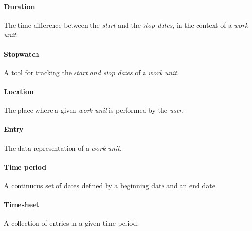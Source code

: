 \paragraph{Duration} The time difference between the \emph{start} and the
  \emph{stop dates}, in the context of a \emph{work unit}.
\paragraph{Stopwatch} A tool for tracking the \emph{start and stop dates} of
  a \emph{work unit}.
\paragraph{Location} The place where a given \emph{work unit} is performed
  by the \emph{user}.
\paragraph{Entry} The data representation of a \emph{work unit}.
\paragraph{Time period} A continuous set of dates defined by a beginning
  date and an end date.
\paragraph{Timesheet} A collection of entries in a given time period.